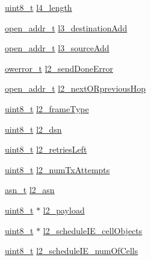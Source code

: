 \begin{DoxyCompactItemize}
\item 
\hyperlink{_p_e___types_8h_aba7bc1797add20fe3efdf37ced1182c5}{uint8\+\_\+t} \hyperlink{struct_open_queue_entry__t_abda1721c7b0eb63726fa9465af446885}{l4\+\_\+length}
\item 
\hyperlink{structopen__addr__t}{open\+\_\+addr\+\_\+t} \hyperlink{struct_open_queue_entry__t_ae03d74d993e4af2003afb3a0a9bb8c74}{l3\+\_\+destination\+Add}
\item 
\hyperlink{structopen__addr__t}{open\+\_\+addr\+\_\+t} \hyperlink{struct_open_queue_entry__t_a9644ca47e59b28449a3b7519a057263c}{l3\+\_\+source\+Add}
\item 
\hyperlink{opendefs_8h_af20b7c3ed9d2ba19e56a309ad9314803}{owerror\+\_\+t} \hyperlink{struct_open_queue_entry__t_a64229ab4680ff8dfca3d7dca6cc57470}{l2\+\_\+send\+Done\+Error}
\item 
\hyperlink{structopen__addr__t}{open\+\_\+addr\+\_\+t} \hyperlink{struct_open_queue_entry__t_ab91fcf71e5cbf35372bff7d0f247fc2b}{l2\+\_\+next\+O\+Rprevious\+Hop}
\item 
\hyperlink{_p_e___types_8h_aba7bc1797add20fe3efdf37ced1182c5}{uint8\+\_\+t} \hyperlink{struct_open_queue_entry__t_a904ffa7656aa3a2cff24036bd7b1b850}{l2\+\_\+frame\+Type}
\item 
\hyperlink{_p_e___types_8h_aba7bc1797add20fe3efdf37ced1182c5}{uint8\+\_\+t} \hyperlink{struct_open_queue_entry__t_a39e7543042b34ad3c5644c1e6efae2fd}{l2\+\_\+dsn}
\item 
\hyperlink{_p_e___types_8h_aba7bc1797add20fe3efdf37ced1182c5}{uint8\+\_\+t} \hyperlink{struct_open_queue_entry__t_a995ab5a1246bdcb9612655399041b8ec}{l2\+\_\+retries\+Left}
\item 
\hyperlink{_p_e___types_8h_aba7bc1797add20fe3efdf37ced1182c5}{uint8\+\_\+t} \hyperlink{struct_open_queue_entry__t_a5815fb8278120d97eb5941cfa098fc47}{l2\+\_\+num\+Tx\+Attempts}
\item 
\hyperlink{structasn__t}{asn\+\_\+t} \hyperlink{struct_open_queue_entry__t_a5bb6b24c2d53ad6a7586c875676a4641}{l2\+\_\+asn}
\item 
\hyperlink{_p_e___types_8h_aba7bc1797add20fe3efdf37ced1182c5}{uint8\+\_\+t} $\ast$ \hyperlink{struct_open_queue_entry__t_a96298b7b0588b0d2e8a570f4e24ba96f}{l2\+\_\+payload}
\item 
\hyperlink{_p_e___types_8h_aba7bc1797add20fe3efdf37ced1182c5}{uint8\+\_\+t} $\ast$ \hyperlink{struct_open_queue_entry__t_a7b215aaeb65deefac11cbf58398d465a}{l2\+\_\+schedule\+I\+E\+\_\+cell\+Objects}
\item 
\hyperlink{_p_e___types_8h_aba7bc1797add20fe3efdf37ced1182c5}{uint8\+\_\+t} \hyperlink{struct_open_queue_entry__t_a20c7a685285a9129a83b0a39a5a80d24}{l2\+\_\+schedule\+I\+E\+\_\+num\+Of\+Cells}

\end{DoxyCompactItemize}
